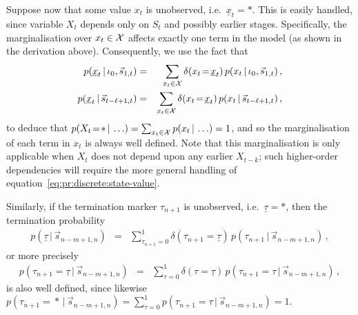 \documentclass[a4paper]{article}
\newcommand{\ut}{\underline{\tau}}
\newcommand{\vs}{\vec{s}}
\newcommand{\ux}{\underline{x}}
\begin{document}
Suppose now that some value $x_t$ is unobserved, i.e.\ $\ux_t=*$. This is easily handled, since variable
$X_t$  depends only on $S_t$ and possibly earlier stages. Specifically, the marginalisation over $x_t\in{\cal X}$ affects exactly one term in the model (as shown in the derivation  above). Consequently, we use the fact that
\begin{eqnarray}
p(\underline{x}_t\,|\,\iota_0,\vs_{1,t}) & = & 
\sum_{x_t\in{\cal X}} \delta(x_t\!=\!\ux_t)\,
p(x_t\,|\,\iota_0,\vs_{1,t})\,,
\\
p(\underline{x}_t\,|\,\vs_{t-\ell+1,t}) & = &
\sum_{x_t\in{\cal X}} \delta(x_t\!=\!\ux_t)\,
p(x_t\,|\,\vs_{t-\ell+1,t})\,,
\end{eqnarray}
to deduce that
$p(X_t\!=\!*\,|\,\ldots)=\sum_{x_t\in{\cal X}}p(x_t\,|\,\ldots)=1$, and so the marginalisation of each term
 in $x_t$ is always well defined. Note that this marginalisation is only applicable when
$X_t$ does not depend upon any earlier $X_{t-k}$; such higher-order dependencies will require the more general handling of  equation~\eqref{eq:pr:discrete:state-value}.

Similarly, if the termination marker $\tau_{n+1}$ is unobserved, i.e.\ $\ut=*$, then 
the termination probability 
\begin{eqnarray}
p(\ut\,|\,\vs_{n-m+1,n}) & = & 
\sum_{\tau_{n+1}=0}^{1}\delta(\tau_{n+1}\!=\!\ut)\,
p(\tau_{n+1}\,|\,\vs_{n-m+1,n})\,,
\label{eq:tau_np1}
\end{eqnarray}
or more precisely
\begin{eqnarray}
p(\tau_{n+1}\!=\!\ut\,|\,\vs_{n-m+1,n}) & = & 
\sum_{\tau=0}^{1}\delta(\tau\!=\!\ut)\,
p(\tau_{n+1}\!=\!\tau\,|\,\vs_{n-m+1,n})\,,
\end{eqnarray}
is also well defined, since likewise 
 $p(\tau_{n+1}\!=\!*\,|\,\vs_{n-m+1,n})=\sum_{\tau=0}^{1} p(\tau_{n+1}\!=\!\tau\,|\,\vs_{n-m+1,n})=1$.
\end{document}
